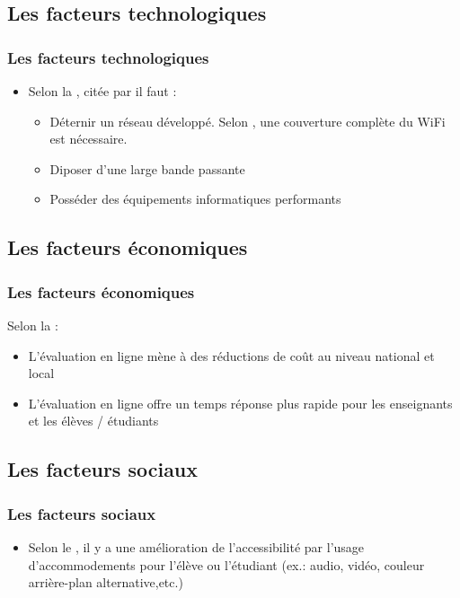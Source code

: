 \documentclass[aspectratio=169]{beamer}
\begin{document}
			
		\subsection{Les facteurs technologiques} 
			\begin{frame}
			 	\frametitle{Les facteurs technologiques}
				\begin {itemize}
					\item Selon la \citet{NorthCarolina2013}, citée par \citet{Lamontagne2013} il faut :
						\begin {itemize}
							\item Déternir un réseau développé. Selon \citet{Stansbury2013B}, une couverture complète du WiFi est nécessaire.
							\item Diposer d'une large bande passante
							\item Posséder des équipements informatiques performants
						\end{itemize} 
				\end{itemize}
			\end{frame}
			
		\subsection{Les facteurs économiques} 
			\begin{frame}
			 	\frametitle{Les facteurs économiques}
				Selon la \citet{NorthCarolina2013} :
				\begin {itemize}
					\item L'évaluation en ligne mène à des réductions de coût au niveau national et local
					\item L'évaluation en ligne offre un temps réponse plus rapide pour les enseignants et les élèves / étudiants
				\end{itemize}
			\end{frame}
			
		\subsection{Les facteurs sociaux} 
			\begin{frame}
			 	\frametitle{Les facteurs sociaux}
				\begin {itemize}
					\item Selon le \citet{NorthCarolina2013}, il y a une amélioration de l'accessibilité par l'usage d'accommodements pour l'élève ou l'étudiant (ex.: audio, vidéo, couleur arrière-plan alternative,etc.) 
					
				\end{itemize}
			\end{frame}
			
\end{document}
